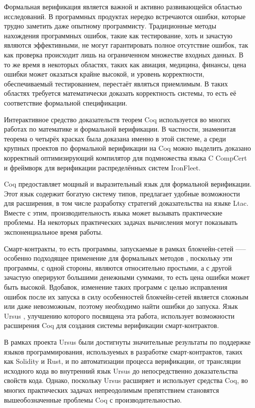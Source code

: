 \documentclass[../diploma.tex]{subfiles}
\begin{document}
 \label{sec:introduction}

Формальная верификация является важной и активно развивающейся областью исследований. В программных продуктах нередко встречаются ошибки, которые трудно заметить даже опытному программисту. Традиционные методы нахождения программных ошибок, такие как тестирование, хоть и зачастую являются эффективными, не могут гарантировать полное отсутствие ошибок, так как проверка происходит лишь на ограниченном множестве входных данных. В то же время в некоторых областях, таких как авиация, медицина, финансы, цена ошибки может оказаться крайне высокой, и уровень корректности, обеспечиваемый тестированием, перестаёт являться приемлимым. В таких областях требуется математически доказать корректность системы, то есть её соответствие формальной спецификации.

Интерактивное средство доказательств теорем Coq используется во многих работах по математике и формальной верификации. В частности, знаменитая теорема о четырёх красках была доказана именно в этой системе, а среди крупных проектов по формальной верификации на Coq можно выделить доказано корректный оптимизирующий компилятор для подмножества языка C CompCert и фреймворк для верификации распределённых систем IronFleet.

Coq предоставляет мощный и выразительный язык для формальной верификации. Этот язык содержит богатую систему типов, предлагает удобные возможности для расширения, в том числе разработку стратегий доказательства на языке Ltac. Вместе с этим, производительность языка может вызывать практические проблемы. На некоторых практических задачах вычисления могут показывать экспоненциальное время работы.

Смарт-контракты, то есть программы, запускаемые в рамках блокчейн-сетей —-- особенно подходящее применение для формальных методов \cite{smart_contracts}, поскольку эти программы, с одной стороны, являются относительно простыми, а с другой зачастую оперируют большими денежными суммами, то есть цена ошибки может быть высокой. Вдобавок, изменение таких программ с целью исправления ошибок после их запуска в силу особенностей блокчейн-сетей является сложным или даже невозможным, поэтому необходимо найти ошибки до запуска. Язык Ursus \cite{ursus}, улучшению которого посвящена эта работа, использует возможности расширения Coq для создания системы верификации смарт-контрактов. 

В рамках проекта Ursus были достигнуты значительные результаты по поддержке языков программирования, используемых в разработке смарт-контрактов, таких как Solidity и Rust, и по автоматизации процесса верификации, от трансляции исходного кода во внутренний язык Ursus до непосредственно доказательства свойств кода. Однако, поскольку Ursus расширяет и использует средства Coq, во многих практических задачах непреодолимым препятствием становятся вышеобозначенные проблемы Coq с производительностью.
\end{document}
